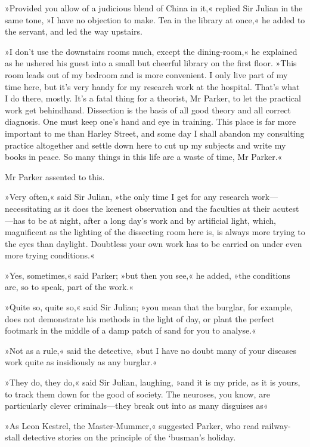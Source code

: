 »Provided you allow of a judicious blend of China in it,« replied Sir Julian in the same tone, »I have no objection to make. Tea in the library at once,« he added to the servant, and led the way upstairs.

»I don't use the downstairs rooms much, except the dining-room,« he explained as he ushered his guest into a small but cheerful library on the first floor. »This room leads out of my bedroom and is more convenient. I only live part of my time here, but it's very handy for my research work at the hospital. That's what I do there, mostly. It's a fatal thing for a theorist, Mr Parker, to let the practical work get behindhand. Dissection is the basis of all good theory and all correct diagnosis. One must keep one's hand and eye in training. This place is far more important to me than Harley Street, and some day I shall abandon my consulting practice altogether and settle down here to cut up my subjects and write my books in peace. So many things in this life are a waste of time, Mr Parker.«

Mr Parker assented to this.

»Very often,« said Sir Julian, »the only time I get for any research work—necessitating as it does the keenest observation and the faculties at their acutest—has to be at night, after a long day's work and by artificial light, which, magnificent as the lighting of the dissecting room here is, is always more trying to the eyes than daylight. Doubtless your own work has to be carried on under even more trying conditions.«

»Yes, sometimes,« said Parker; »but then you see,« he added, »the conditions are, so to speak, part of the work.«

»Quite so, quite so,« said Sir Julian; »you mean that the burglar, for example, does not demonstrate his methods in the light of day, or plant the perfect footmark in the middle of a damp patch of sand for you to analyse.«

»Not as a rule,« said the detective, »but I have no doubt many of your diseases work quite as insidiously as any burglar.«

»They do, they do,« said Sir Julian, laughing, »and it is my pride, as it is yours, to track them down for the good of society. The neuroses, you know, are particularly clever criminals—they break out into as many disguises as\longdash«

»As Leon Kestrel, the Master-Mummer,« suggested Parker, who read railway-stall detective stories on the principle of the `busman's holiday.

